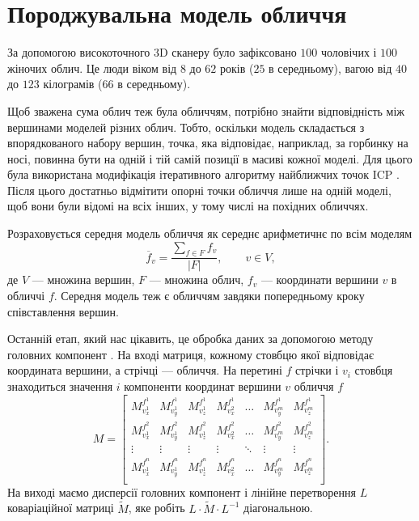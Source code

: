 \section{Породжувальна модель обличчя}

За допомогою високоточного 3D сканеру
було зафіксовано $100$ чоловічих і $100$ жіночих облич.
Це люди віком від $8$ до $62$ років ($25$ в середньому),
вагою від $40$ до $123$ кілограмів ($66$ в середньому).

Щоб зважена сума облич теж була обличчям,
потрібно знайти відповідність між вершинами моделей різних облич.
Тобто, оскільки модель складається з впорядкованого набору вершин,
точка, яка відповідає, наприклад, за горбинку на носі,
повинна бути на одній і тій самій позиції в масиві кожної моделі.
Для цього була використана модифікація
ітеративного алгоритму найближчих точок ICP \cite{AmbergRV07}.
Після цього достатньо відмітити опорні точки обличчя лише на одній моделі,
щоб вони були відомі на всіх інших,
у тому числі на похідних обличчях.

Розраховується середня модель обличчя як середнє арифметичнє по всім моделям
\begin{equation*}
  \overline{f}_v
  = \frac{\sum\limits_{f \in F} f_v}{\left| F \right|},\qquad
  v \in V,
\end{equation*}
де $V$ --- множина вершин, $F$ --- множина облич,
$f_v$ --- координати вершини $v$ в обличчі $f$.
Середня модель теж є обличчям завдяки попередньому кроку співставлення вершин.

Останній етап, який нас цікавить,
це обробка даних за допомогою методу головних компонент \cite{Aivazyan:1989}.
На вході матриця, кожному стовбцю якої відповідає координата вершини,
а стрічці --- обличчя.
На перетині $f$ стрічки і $v_i$ стовбця знаходиться значення $i$ компоненти
координат вершини $v$ обличчя $f$
\begin{equation*}
  M = \begin{bmatrix}
    M_{v_x^1}^{f^1} & M_{v_y^1}^{f^1} & M_{v_z^1}^{f^1} & M_{v_x^2}^{f^1}
      & \dots                         & M_{v_y^m}^{f^1} & M_{v_z^m}^{f^1} \\
    M_{v_x^1}^{f^2} & M_{v_y^1}^{f^2} & M_{v_z^1}^{f^2} & M_{v_x^2}^{f^2}
      & \dots                         & M_{v_y^m}^{f^2} & M_{v_z^m}^{f^2} \\
    \vdots          & \vdots          & \vdots          & \vdots
      & \ddots                        & \vdots          & \vdots \\
    M_{v_x^1}^{f^n} & M_{v_y^1}^{f^n} & M_{v_z^1}^{f^n} & M_{v_x^2}^{f^n}
      & \dots                         & M_{v_y^m}^{f^n} & M_{v_z^m}^{f^n} \\
  \end{bmatrix}.
\end{equation*}
На виході маємо дисперсії головних компонент
і лінійне перетворення $L$ коваріаційної матриці $\widetilde{M}$,
яке робіть $L \cdot \widetilde{M} \cdot L^{-1}$ діагональною.

